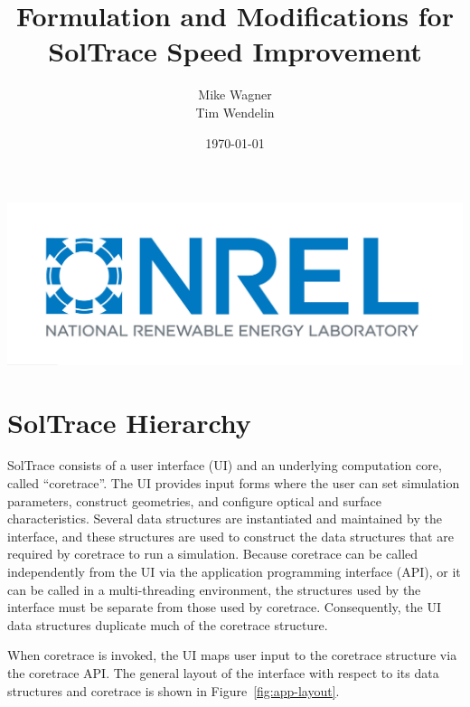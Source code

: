\documentclass[11pt,letterpaper]{article}
\title{Formulation and Modifications for SolTrace Speed Improvement}
\author{Mike Wagner \\ Tim Wendelin }
\date{\today}
\newcommand{\figref}[1]{Figure~\ref{#1}}
\begin{document}
\maketitle

\vspace{0.5\textheight}

\centering
\includegraphics[width=0.5\linewidth]{nrel-logo}

\raggedright

\clearpage


\section{SolTrace Hierarchy}

SolTrace consists of a user interface (UI) and an underlying computation core, called ``coretrace''. 
The UI provides input forms where the user can set simulation parameters, construct geometries, and configure optical and surface characteristics. 
Several data structures are instantiated and maintained by the interface, and these structures are used to construct the data structures that are required by coretrace to run a simulation. 
Because coretrace can be called independently from the UI via the application programming interface (API), or it can be called in a multi-threading environment, the structures used by the interface must be separate from those used by coretrace. 
Consequently, the UI data structures duplicate much of the coretrace structure. 

When coretrace is invoked, the UI maps user input to the coretrace structure via the coretrace API. The general layout of the interface with respect to its data structures and coretrace is shown in \figref{fig:app-layout}. 
\end{document}
